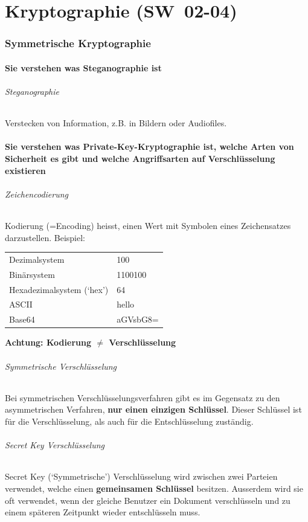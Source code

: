 \documentclass[10pt,a4paper]{article}
\begin{document}
\part{Kryptographie (SW~02-04)}
\section{Symmetrische Kryptographie}
\subsection*{Sie verstehen was Steganographie ist}
\paragraph*{Steganographie}Verstecken von Information, z.B. in Bildern oder Audiofiles.
\subsection*{Sie verstehen was Private-Key-Kryptographie ist, welche Arten von Sicherheit es gibt und welche Angriffsarten auf Verschlüsselung existieren}
\paragraph*{Zeichencodierung}Kodierung (=Encoding) heisst, einen Wert mit Symbolen eines Zeichensatzes darzustellen. Beispiel:\\
\begin{tabular}{ |ll|}
    \hline
        Dezimalsystem & 100\\
        Binärsystem & 1100100\\
        Hexadezimalsystem (`hex') & 64\\
        ASCII & hello\\
        Base64 & aGVsbG8=\\
    \hline
\end{tabular}
{\color{red}\textbf{Achtung: Kodierung $\neq$ Verschlüsselung}}
\paragraph*{Symmetrische Verschlüsselung}Bei symmetrischen Verschlüsselungsverfahren gibt es im Gegensatz zu den asymmetrischen Verfahren, \textbf{nur einen einzigen Schlüssel}. Dieser Schlüssel ist für die Verschlüsselung, als auch für die Entschlüsselung zuständig.
\paragraph*{Secret Key Verschlüsselung}Secret Key (`Symmetrische') Verschlüsselung wird zwischen zwei Parteien verwendet, welche einen \textbf{gemeinsamen Schlüssel} besitzen. Ausserdem wird sie oft verwendet, wenn der gleiche Benutzer ein Dokument verschlüsseln und zu einem späteren Zeitpunkt wieder entschlüsseln muss.
\end{document}
